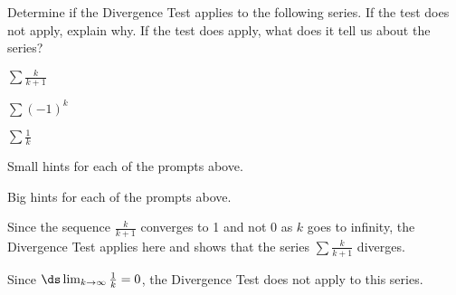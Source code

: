 \begin{activity} \label{8.3.Act3} Determine if the Divergence Test applies to the following series. If the test does not apply, explain why. If the test does apply, what does it tell us about the series?

\ba
\item  $\sum \frac{k}{k+1}$
\item  $\sum (-1)^k $

\item  $\sum \frac{1}{k}$

\ea
\end{activity}

\begin{smallhint}
\ba
	\item Small hints for each of the prompts above.
\ea
\end{smallhint}
\begin{bighint}
\ba
	\item Big hints for each of the prompts above.
\ea
\end{bighint}
\begin{activitySolution}
\ba
	\item Since the sequence $\frac{k}{k+1}$ converges to 1 and not 0 as $k$ goes to infinity, the Divergence Test applies here and shows that the series $\sum \frac{k}{k+1}$ diverges.
    \item Since $\ds \lim_{k \to \infty} \frac{1}{k} = 0$, the Divergence Test does not apply to this series. 
\ea
\end{activitySolution}
\aftera 